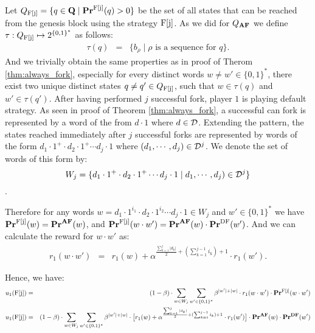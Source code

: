 Let $Q_{\text{\rm F[{j}]}} = \{q \in \mathbf{Q} \mid \mathbf{Pr}^{\text{\rm F[{j}]}}(q) > 0\}$ be the set of all states that can be reached from the genesis block using the strategy $\text{\rm F[{j}]}$. As we did for $Q_{\text{\rm {\bf AF}}}$ we define $\tau:Q_{\text{\rm F[{j}]}} \mapsto 2^{\{0,1\}^*}$ as follows:
\begin{eqnarray*}
\tau(q) & = & \{ b_\rho \mid \rho \text{ is a sequence for } q\}.
\end{eqnarray*}
And we trivially obtain the same properties as in proof of Therom \ref{thm:always_fork}, especially for every distinct words $w \neq w' \in \{0, 1\} ^*$, there exist two unique distinct states $q \neq q' \in Q_{\text{\rm F[{j}]}}$,  such that $w \in \tau(q)$ and $w' \in \tau(q')$.
After having performed $j$ successful fork, player $1$ is playing default strategy. As seen in proof of Theorem \ref{thm:always_fork}, a successful can fork is represented by a word of the from $d\cdot 1$ where $d \in \mathcal{D}$. Extending the pattern, the states reached immediately after $j$ successful forks are represented by words of the form $d_1 \cdot 1^+ \cdot d_2 \cdot 1^+ \cdots d_j \cdot 1$ where $(d_1, \cdots, d_j) \in \mathcal{D}^j$. We denote the set of words of this form by:
\begin{equation*}W_j = \{d_1 \cdot 1^+ \cdot d_2 \cdot 1^+ \cdots d_j \cdot 1 \mid d_1, \cdots, d_j) \in \mathcal{D}^j\}
\end{equation*}.

Therefore for any words $w = d_1 \cdot 1^{i_1} \cdot d_2 \cdot 1^{i_2} \cdots d_j \cdot 1 \in W_j$ and $w' \in \{0, 1\} ^*$ we have $\mathbf{Pr}^{\text{\rm F[{j}]}}(w) = \mathbf{Pr}^{\text{\rm {\bf AF}}}(w)$, and $\mathbf{Pr}^{\text{\rm F[{j}]}}(w\cdot w') = \mathbf{Pr}^{\text{\rm {\bf AF}}}(w)\cdot \mathbf{Pr}^{\text{\rm DF}}(w')$. And we can calculate the reward for $w\cdot w'$ as:
\begin{eqnarray*}
r_1(w\cdot w') & = & r_1(w) + \alpha^{\frac{\sum_{k=1}^{j} |d_k|}{2}+(\sum_{k=1}^{j-1} i_k) +1}\cdot r_1(w').
\end{eqnarray*}

Hence, we have:
\begin{eqnarray*}
u_1(\text{\rm F[{j}]})& = & (1-\beta)\cdot\sum_{w \in W_j}  \sum_{w'\in \{0,1\}^*}\beta^{|w'|+|w|}\cdot r_1(w\cdot w') \cdot \mathbf{Pr}^{\text{\rm F[{j}]}}(w\cdot w')\\
u_1(\text{\rm F[{j}]}) & = & (1-\beta)\cdot\sum_{w \in W_j}  \sum_{w'\in \{0,1\}^*}\beta^{|w'|+|w|}\cdot \big[r_1(w) + \alpha^{\frac{\sum_{k=1}^{j} |d_k|}{2}+(\sum_{k=1}^{j-1} i_k) +1}\cdot r_1(w') \big] \cdot \mathbf{Pr}^{\text{\rm {\bf AF}}}(w)\cdot\mathbf{Pr}^{\text{\rm {\bf DF}}}(w')
\end{eqnarray*}

